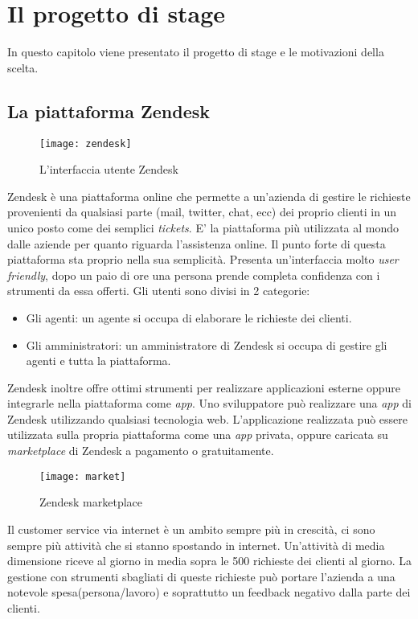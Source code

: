 
\chapter{Il progetto di stage}

\label{cap:progetto}
In questo capitolo viene presentato il progetto di stage e le motivazioni della scelta.
\section{La piattaforma Zendesk}
\begin{figure}[!h] 
	\centering 
	\texttt{[image: zendesk]} 
	\caption{L'interfaccia utente Zendesk}
\end{figure}
Zendesk è una piattaforma online che permette a un'azienda di gestire le richieste provenienti da qualsiasi parte (mail, twitter, chat, ecc) dei proprio clienti in un unico posto come dei semplici \emph{tickets}. E' la piattaforma più utilizzata al mondo dalle aziende per quanto riguarda l'assistenza online. Il punto forte di questa piattaforma sta proprio nella sua semplicità. Presenta un'interfaccia molto \emph{user friendly}, dopo un paio di ore una persona prende completa confidenza con i strumenti da essa offerti. Gli utenti sono divisi in 2 categorie:
	\begin{itemize}
		\item Gli agenti: un agente si occupa di elaborare le richieste dei clienti. 
		\item Gli amministratori: un amministratore di Zendesk si occupa di gestire gli agenti e tutta la piattaforma. 
	\end{itemize}
\newpage
Zendesk inoltre offre ottimi strumenti per realizzare applicazioni esterne oppure integrarle nella piattaforma come \emph{app}. Uno sviluppatore può realizzare una \emph{app} di Zendesk utilizzando qualsiasi tecnologia web. L'applicazione realizzata può essere utilizzata sulla propria piattaforma come una \emph{app} privata, oppure caricata su \emph{marketplace} di Zendesk a pagamento o gratuitamente.  
 
\begin{figure}[!h] 
	\centering 
	\texttt{[image: market]} 
	\caption{Zendesk marketplace}
	\end{figure}

Il customer service via internet è un ambito sempre più in crescità, ci sono sempre più attività che si stanno spostando in internet. Un'attività di media dimensione riceve al giorno in media sopra le 500 richieste dei clienti al giorno. La gestione con strumenti sbagliati di queste richieste può portare l'azienda a una notevole spesa(persona/lavoro) e soprattutto un feedback negativo dalla parte dei clienti. 
